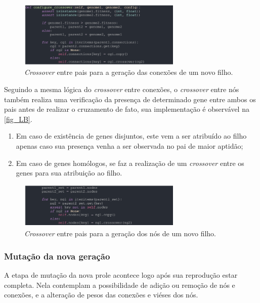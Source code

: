 \begin{figure}[htb]
        \centering
        \caption{\label{fig_LA}\textit{Crossover} entre pais para a geração das conexões de um novo filho.}
        \includegraphics[width=0.7\textwidth]{images/LA.png}
\end{figure}

Seguindo a mesma lógica do \textit{crossover} entre conexões, o \textit{crossover} entre
nós também realiza uma verificação da presença de determinado gene entre ambos os pais antes
de realizar o cruzamento de fato, sua implementação é observável na \autoref{fig_LB}.

\begin{enumerate}
	\item Em caso de existência de genes disjuntos, este vem a ser atribuído ao filho apenas caso sua presença venha a  ser observada no pai de maior aptidão;
	\item Em caso de genes homólogos, se faz a realização de um \textit{crossover} entre os genes para sua atribuição ao filho.
\end{enumerate}

\begin{figure}[htb]
        \centering
        \caption{\label{fig_LB}\textit{Crossover} entre pais para a geração dos nós de um novo filho.}
        \includegraphics[width=0.7\textwidth]{images/LB.png}
\end{figure}

\subsubsection{Mutação da nova geração}
A etapa de mutação da nova prole acontece logo após sua reprodução estar completa. Nela contemplam a
possibilidade de adição ou remoção de nós e conexões, e a alteração de pesos das conexões e viéses dos nós.

